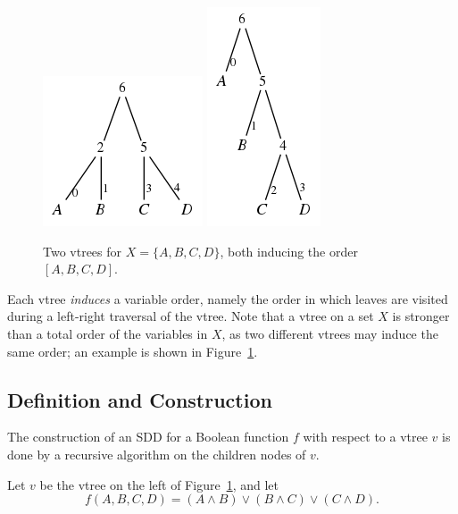 \documentclass[11pt]{report}
\begin{document}
\begin{figure}
\centering
\includegraphics[scale=0.5]{balancedABCD.png}
\qquad
\includegraphics[scale=0.5]{rightlinearABCD.png}


\caption{Two vtrees for $X = \{A, B, C, D\}$, both inducing the order $[A, B, C, D]$.}
\label{fig:vtree_examples} 

\end{figure}
Each vtree \textit{induces} a variable order, namely the order in which leaves are visited during a left-right traversal of the vtree. Note that a vtree on a set $X$ is stronger than a total order of the variables in $X$, as two different vtrees may induce the same order; an example is shown in Figure~\ref{fig:vtree_examples}.

\subsection{Definition and Construction}

The construction of an SDD for a Boolean function $f$ with respect to a vtree $v$ is done by a recursive algorithm on the children nodes of $v$. 

Let $v$ be the vtree on the left of Figure~\ref{fig:vtree_examples}, and let $$f(A, B, C, D) = (A \land B) \lor (B \land C) \lor (C \land D).$$
\end{document}
